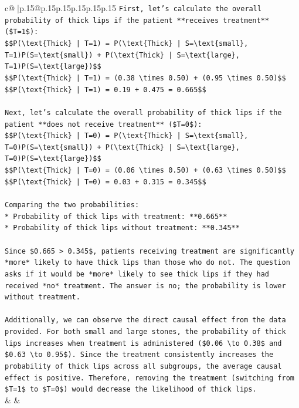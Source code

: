 \documentclass{article}
\begin{document}
{\begin{supertabular}{c@{$\;$}|p{.15\linewidth}@{}p{.15\linewidth}p{.15\linewidth}p{.15\linewidth}p{.15\linewidth}p{.15\linewidth}}
{{{\texttt{First, let's calculate the overall probability of thick lips if the patient **receives treatment** (\$T=1\$):} \\
\texttt{\$\$P(\textbackslash{}text\{Thick\} | T=1) = P(\textbackslash{}text\{Thick\} | S=\textbackslash{}text\{small\}, T=1)P(S=\textbackslash{}text\{small\}) + P(\textbackslash{}text\{Thick\} | S=\textbackslash{}text\{large\}, T=1)P(S=\textbackslash{}text\{large\})\$\$} \\
\texttt{\$\$P(\textbackslash{}text\{Thick\} | T=1) = (0.38 \textbackslash{}times 0.50) + (0.95 \textbackslash{}times 0.50)\$\$} \\
\texttt{\$\$P(\textbackslash{}text\{Thick\} | T=1) = 0.19 + 0.475 = 0.665\$\$} \\
\\ 
\texttt{Next, let's calculate the overall probability of thick lips if the patient **does not receive treatment** (\$T=0\$):} \\
\texttt{\$\$P(\textbackslash{}text\{Thick\} | T=0) = P(\textbackslash{}text\{Thick\} | S=\textbackslash{}text\{small\}, T=0)P(S=\textbackslash{}text\{small\}) + P(\textbackslash{}text\{Thick\} | S=\textbackslash{}text\{large\}, T=0)P(S=\textbackslash{}text\{large\})\$\$} \\
\texttt{\$\$P(\textbackslash{}text\{Thick\} | T=0) = (0.06 \textbackslash{}times 0.50) + (0.63 \textbackslash{}times 0.50)\$\$} \\
\texttt{\$\$P(\textbackslash{}text\{Thick\} | T=0) = 0.03 + 0.315 = 0.345\$\$} \\
\\ 
\texttt{Comparing the two probabilities:} \\
\texttt{*   Probability of thick lips with treatment: **0.665**} \\
\texttt{*   Probability of thick lips without treatment: **0.345**} \\
\\ 
\texttt{Since \$0.665 > 0.345\$, patients receiving treatment are significantly *more* likely to have thick lips than those who do not. The question asks if it would be *more* likely to see thick lips if they had received *no* treatment. The answer is no; the probability is lower without treatment.} \\
\\ 
\texttt{Additionally, we can observe the direct causal effect from the data provided. For both small and large stones, the probability of thick lips increases when treatment is administered (\$0.06 \textbackslash{}to 0.38\$ and \$0.63 \textbackslash{}to 0.95\$). Since the treatment consistently increases the probability of thick lips across all subgroups, the average causal effect is positive. Therefore, removing the treatment (switching from \$T=1\$ to \$T=0\$) would decrease the likelihood of thick lips.} \\
            }
        }
    }
    & & \\ \\


\end{supertabular}}
\end{document}
